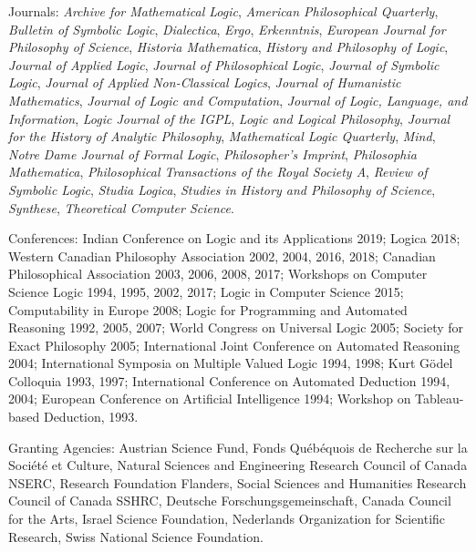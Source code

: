 \documentclass[11pt]{article}
\begin{document}
\ind Journals: \emph{Archive for  Mathematical Logic},
\emph{American Philosophical Quarterly},
\emph{Bulletin of Symbolic Logic}, \emph{Dialectica}, \emph{Ergo},
\emph{Erkenntnis}, \emph{European Journal for Philosophy of Science},
\emph{Historia Mathematica}, \emph{History and Philosophy of Logic},
\emph{Journal of Applied Logic}, \emph{Journal of Philosophical Logic},
\emph{Journal of Symbolic Logic},
\emph{Journal of Applied Non-Classical Logics},
\emph{Journal of Humanistic Mathematics},
\emph{Journal of Logic and Computation},
\emph{Journal of Logic, Language, and Information},
\emph{Logic Journal of the IGPL}, \emph{Logic and Logical Philosophy},
\emph{Journal for the History of Analytic Philosophy},
\emph{Mathematical Logic Quarterly}, \emph{Mind},
\emph{Notre Dame Journal of Formal Logic}, \emph{Philosopher's Imprint},
\emph{Philosophia Mathematica},
\emph{Philosophical Transactions of the Royal Society A},
\emph{Review of Symbolic Logic}, \emph{Studia Logica},
\emph{Studies in History and Philosophy of Science}, \emph{Synthese},
\emph{Theoretical Computer Science}. 

\ind Conferences: Indian Conference on Logic and its Applications 2019;
Logica 2018; Western Canadian Philosophy Association 2002, 2004, 2016,
2018; Canadian Philosophical Association 2003, 2006, 2008, 2017;
Workshops on Computer Science Logic 1994, 1995, 2002, 2017; Logic in
Computer Science 2015; Computability in Europe 2008; Logic for
Programming and Automated Reasoning 1992, 2005, 2007; World Congress on
Universal Logic 2005; Society for Exact Philosophy 2005; International
Joint Conference on Automated Reasoning 2004; International Symposia on
Multiple Valued Logic 1994, 1998; Kurt Gödel Colloquia 1993, 1997;
International Conference on Automated Deduction 1994, 2004; European
Conference on Artificial Intelligence 1994; Workshop on Tableau-based
Deduction, 1993. 

\ind Granting Agencies: Austrian Science Fund, Fonds Québéquois de Recherche
sur la Société et Culture, Natural Sciences and Engineering Research
Council of Canada NSERC, Research Foundation Flanders, Social Sciences
and Humanities Research Council of Canada SSHRC, Deutsche
Forschungsgemeinschaft, Canada Council for the Arts, Israel Science
Foundation, Nederlands Organization for Scientific Research, Swiss
National Science Foundation. 
\end{document}
